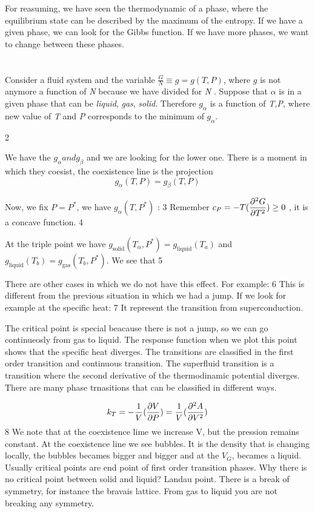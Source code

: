 \documentclass[../main/main.tex]{subfiles}
\begin{document}
For reasuming, we have seen the thermodynamic of a phase, where the equilibrium state can be described by the maximum of the entropy. If we have a given phase, we can look for the Gibbs function. If we have more phases, we want to change between these phases.

\section{}

Consider a fluid system and the variable \( \frac{G}{N} \equiv g = g (T,P) \), where \( g \) is not anymore a function of \emph{N}  because we have divided for \emph{N} . Suppose that \( \alpha  \) is in a given phase that can be \emph{liquid}, \emph{gas}, \emph{solid}. Therefore \( g_ \alpha  \)  is a function of \emph{T,P}, where new value of \emph{T}  and \emph{P}  corresponds to the minimum of \( g_ \alpha \).

2

We have the \( g_ \alpha and g_\beta \) and we are looking for the lower one. There is a moment in which they coesist, the coexistence line is the projection
\[ g_ \alpha(T,P) = g_ \beta(T,P) \]

Now, we fix \( P = P^* \), we have \( g_ \alpha (T,P^*) \) :
3
Remember \( c_P = - T ( \displaystyle \frac{\partial^{2} G}{\partial T^{2} } ) \ge 0 \) , it is a concave function.
4

At the triple point we have \( g_{\text{solid}}(T_ \alpha, P^*) = g_{\text{liquid}}(T_a) \) and \( g_{\text{liquid}}(T_b) = g_{\text{gas}}(T_b , P^*) \).
We see that
5

There are other cases in which we do not have this effect. For example:
6
This is different from the previous situation in which we had a jump.
If we look for example at the specific heat:
7
It represent the transition from superconduction.

The critical point is special beacause there is not a jump, so we can go continueosly from gas to liquid. The response function when we plot this point shows that the specific heat diverges.
The transitions are classified in the first order transition and continuous transition. The superfluid transition is a transition where the second derivative of the thermodinamic potential diverges. There are many phase trnasitions that can be classified in different ways.

\[ k_T = - \frac{1}{V} ( \displaystyle \frac{\partial V}{\partial P} ) = \frac{1}{V} (\displaystyle \frac{\partial^{2} A}{\partial V^{2} } ) \]
8
We note that at the coexistence lime we increase V, but the pression remains constant. At the coexistence line we see bubbles. It is the density that is changing locally, the bubbles becames bigger and bigger and at the $V_G$, becames a liquid.
Usually critical points are end point of first order transition phases. Why there is no critical point between solid and liquid? Landau point. There is a break of symmetry, for instance the bravais lattice.
From gas to liquid you are not breaking any symmetry.
\end{document}
